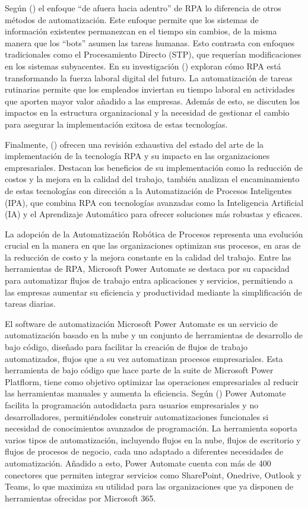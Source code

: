 \documentclass[letter,oneside,12pt,spanish]{report}
\begin{document}
\noindent Según (\cite{aalst2018bpm}) el enfoque “de afuera hacia adentro” de RPA lo diferencia de otros métodos de automatización. Este enfoque permite que los sistemas de información existentes permanezcan en el tiempo sin cambios, de la misma manera que los “bots” asumen las tareas humanas. Esto contrasta con enfoques tradicionales como el Procesamiento Directo (STP), que requerían modificaciones en los sistemas subyacentes. En su investigación (\cite{madakam2019rpa}) exploran cómo RPA está transformando la fuerza laboral digital del futuro. La automatización de tareas rutinarias permite que los empleados inviertan su tiempo laboral en actividades que aporten mayor valor añadido a las empresas. Además de esto, se discuten los impactos en la estructura organizacional y la necesidad de gestionar el cambio para asegurar la implementación exitosa de estas tecnologías.

\noindent Finalmente, (\cite{gami2019rpa}) ofrecen una revisión exhaustiva del estado del arte de la implementación de la tecnología RPA y su impacto en las organizaciones empresariales. Destacan los beneficios de su implementación como la reducción de costos y la mejora en la calidad del trabajo, también analizan el encaminamiento de estas tecnologías con dirección a la Automatización de Procesos Inteligentes (IPA), que combina RPA con tecnologías avanzadas como la Inteligencia Artificial (IA) y el Aprendizaje Automático para ofrecer soluciones más robustas y eficaces. 

\noindent La adopción de la Automatización Robótica de Procesos representa una evolución crucial en la manera en que las organizaciones optimizan sus procesos, en aras de la reducción de costo y la mejora constante en la calidad del trabajo. Entre las herramientas de RPA, Microsoft Power Automate se destaca por su capacidad para automatizar flujos de trabajo entra aplicaciones y servicios, permitiendo a las empresas aumentar su eficiencia y productividad mediante la simplificación de tareas diarias.

\noindent El software de automatización Microsoft Power Automate es un servicio de automatización basado en la nube y un conjunto de herramientas de desarrollo de bajo código, diseñado para facilitar la creación de flujos de trabajo automatizados, flujos que a su vez automatizan procesos empresariales. Esta herramienta de bajo código que hace parte de la suite de Microsoft Power Platflorm, tiene como objetivo optimizar las operaciones empresariales al reducir las herramientas manuales y aumenta la eficiencia. Según (\cite{najjar2023powerautomate}) Power Automate facilita la programación autodidacta para usuarios empresariales y no desarrolladores, permitiéndoles construir automatizaciones funcionales si necesidad de conocimientos avanzados de programación. La herramienta soporta varios tipos de automatización, incluyendo flujos en la nube, flujos de escritorio y flujos de procesos de negocio, cada uno adaptado a diferentes necesidades de automatización. Añadido a esto, Power Automate cuenta con más de 400 conectores que permiten integrar servicios como SharePoint, Onedrive, Outlook y Teams, lo que maximiza su utilidad para las organizaciones que ya disponen de herramientas ofrecidas por Microsoft 365.
\end{document}
